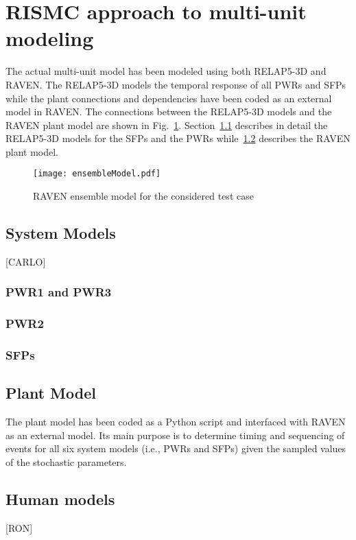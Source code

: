 \section{RISMC approach to multi-unit modeling}
\label{sec:RISMC_MU_modeling}

The actual multi-unit model has been modeled using both RELAP5-3D and RAVEN.
The RELAP5-3D models the temporal response of all PWRs and SFPs while the plant 
connections and dependencies have been coded as an external model in RAVEN.
The connections between the RELAP5-3D models and the RAVEN plant model are 
shown in Fig.~\ref{fig:ensembleModel}.
Section~\ref{sec:systemModels} describes in detail the RELAP5-3D models for 
the SFPs and the PWRs while~\ref{sec:plantModel} describes the RAVEN plant model.
 
\begin{figure}
    \centering
    \texttt{[image: ensembleModel.pdf]}
    \caption{RAVEN ensemble model for the considered test case}
    \label{fig:ensembleModel}
\end{figure}

\subsection{System Models}
\label{sec:systemModels}
[CARLO]
\subsubsection{PWR1 and PWR3}

\subsubsection{PWR2}

\subsubsection{SFPs}

\subsection{Plant Model}
\label{sec:plantModel}
The plant model has been coded as a Python script and interfaced with RAVEN as an 
external model. Its main purpose is to determine timing and sequencing of events 
for all six system models (i.e., PWRs and SFPs) given the sampled values of the 
stochastic parameters.

\subsection{Human models}
[RON]

